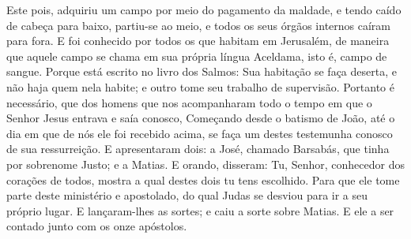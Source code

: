 {Este pois, adquiriu um campo por meio do pagamento da maldade, e tendo caído de cabeça para baixo, partiu-se ao meio, e todos os seus órgãos internos caíram para fora.
E
{} foi conhecido por todos os que habitam em Jerusalém, de maneira que aquele campo se chama em sua própria língua Aceldama, isto é, campo de sangue.
Porque está escrito no livro dos Salmos: Sua habitação se faça deserta, e não haja quem nela habite; e outro tome seu trabalho de supervisão.
Portanto é necessário, que dos homens que nos acompanharam todo o tempo em que o Senhor Jesus entrava e saía conosco,
Começando desde o batismo de João, até o dia em que
{} de nós ele foi recebido acima, se faça um destes testemunha conosco de sua ressurreição.
E apresentaram dois: a José, chamado Barsabás, que tinha por sobrenome
{} Justo; e a Matias.
E orando, disseram: Tu, Senhor, conhecedor dos corações de todos, mostra a qual destes dois tu tens escolhido.
Para que ele tome parte deste ministério e apostolado, do qual Judas se desviou para ir a seu próprio lugar.
E lançaram-lhes as sortes; e caiu a sorte sobre Matias. E ele
{} a ser contado junto com os onze apóstolos.

}
